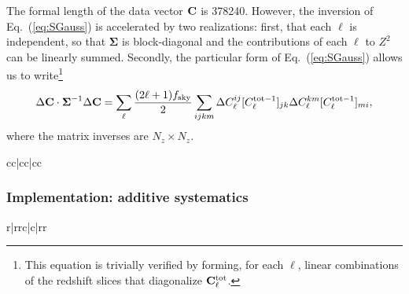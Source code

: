 The formal length of the data vector ${\bf C}$ is 378240. However, the inversion of Eq.~(\ref{eq:SGauss}) is accelerated by two realizations: first, that each $\ell$ is independent, so that ${\boldsymbol\Sigma}$ is block-diagonal and the contributions of each $\ell$ to $Z^2$ can be linearly summed. Secondly, the particular form of Eq.~(\ref{eq:SGauss}) allows us to write\footnote{This equation is trivially verified by forming, for each $\ell$, linear combinations of the redshift slices that diagonalize ${\bf C}^{\rm tot}_\ell$.}
\begin{equation}
\Delta{\bf C} \cdot {\boldsymbol\Sigma}^{-1} \Delta {\bf C}
 = \sum_\ell \frac{(2\ell+1)f_{\rm sky}}2 \sum_{ijkm}
 \Delta C_\ell^{ij} [C^{{\rm tot}-1}_\ell]_{jk}
 \Delta C_\ell^{km} [C^{{\rm tot}-1}_\ell]_{mi},
\label{eq:sprodform}
\end{equation}
where the matrix inverses are $N_z\times N_z$.

\begin{deluxetable}{cc|cc|cc}
\startdata

\enddata
\end{deluxetable}

\subsubsection{Implementation: additive systematics}
\label{ss:implement-add}

\begin{deluxetable}{r|rrc|c|rr}
\startdata

\enddata
\end{deluxetable}

